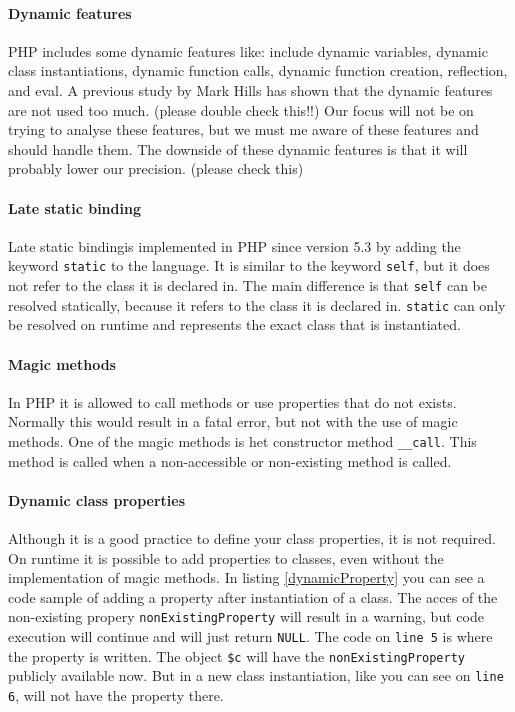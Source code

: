 \documentclass[../main.tex]{subfiles}
\begin{document}
    
    \paragraph{Dynamic features}
    PHP includes some dynamic features like: include dynamic variables, dynamic class instantiations, dynamic function calls, dynamic function creation, reflection, and eval.
    A previous study by Mark Hills\cite{Hil:13} has shown that the dynamic features are not used too much. (please double check this!!) %
    Our focus will not be on trying to analyse these features, but we must me aware of these features and should handle them.
    The downside of these dynamic features is that it will probably lower our precision. (please check this) %
    

    \paragraph{Late static binding}
    Late static binding\footnotemark is implemented in PHP since version 5.3 by adding the keyword \texttt{static} to the language.
    It is similar to the keyword \texttt{self}, but it does not refer to the class it is declared in. 
    The main difference is that \texttt{self} can be resolved statically, because it refers to the class it is declared in.
    \texttt{static} can only be resolved on runtime and represents the exact class that is instantiated.
    
    \paragraph{Magic methods}
    In PHP it is allowed to call methods or use properties that do not exists.
    Normally this would result in a fatal error, but not with the use of magic methods.
    One of the magic methods is het constructor method \texttt{\_\_{}call}.
    This method is called when a non-accessible or non-existing method is called.

    \paragraph{Dynamic class properties}
    Although it is a good practice to define your class properties, it is not required.
    On runtime it is possible to add properties to classes, even without the implementation of magic methods.
    In listing \ref{dynamicProperty} you can see a code sample of adding a property after instantiation of a class.
    The acces of the non-existing propery \texttt{nonExistingProperty} will result in a warning, but code execution will continue and will just return \texttt{NULL}.
    The code on \texttt{line 5} is where the property is written.
    The object \texttt{\$c} will have the \texttt{nonExistingProperty} publicly available now.
    But in a new class instantiation, like you can see on \texttt{line 6}, will not have the property there.
    
\end{document}
